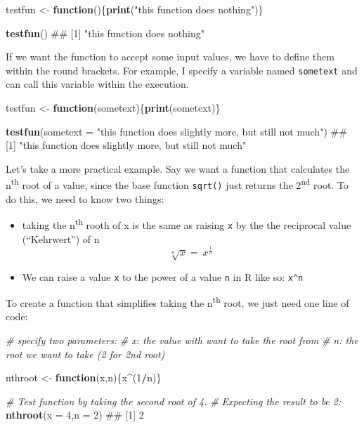 \documentclass[]{book}
\newenvironment{Shaded}{\begin{snugshade}}{\end{snugshade}}
\newcommand{\KeywordTok}[1]{\textcolor[rgb]{0.13,0.29,0.53}{\textbf{#1}}}
\newcommand{\DataTypeTok}[1]{\textcolor[rgb]{0.13,0.29,0.53}{#1}}
\newcommand{\DecValTok}[1]{\textcolor[rgb]{0.00,0.00,0.81}{#1}}
\newcommand{\StringTok}[1]{\textcolor[rgb]{0.31,0.60,0.02}{#1}}
\newcommand{\CommentTok}[1]{\textcolor[rgb]{0.56,0.35,0.01}{\textit{#1}}}
\newcommand{\ControlFlowTok}[1]{\textcolor[rgb]{0.13,0.29,0.53}{\textbf{#1}}}
\newcommand{\OperatorTok}[1]{\textcolor[rgb]{0.81,0.36,0.00}{\textbf{#1}}}
\newcommand{\NormalTok}[1]{#1}
\providecommand{\tightlist}{%
  \setlength{\itemsep}{0pt}\setlength{\parskip}{0pt}}
\begin{document}
\begin{Shaded}
\begin{Highlighting}[]
\NormalTok{testfun <-}\StringTok{ }\ControlFlowTok{function}\NormalTok{()\{}\KeywordTok{print}\NormalTok{(}\StringTok{"this function does nothing"}\NormalTok{)\}}

\KeywordTok{testfun}\NormalTok{()}
\NormalTok{## [1] "this function does nothing"}
\end{Highlighting}
\end{Shaded}

If we want the function to accept some input values, we have to define
them within the round brackets. For example, I specify a variable named
\texttt{sometext} and can call this variable within the execution.

\begin{Shaded}
\begin{Highlighting}[]
\NormalTok{testfun <-}\StringTok{ }\ControlFlowTok{function}\NormalTok{(sometext)\{}\KeywordTok{print}\NormalTok{(sometext)\}}

\KeywordTok{testfun}\NormalTok{(}\DataTypeTok{sometext =} \StringTok{"this function does slightly more, but still not much"}\NormalTok{)}
\NormalTok{## [1] "this function does slightly more, but still not much"}
\end{Highlighting}
\end{Shaded}

Let's take a more practical example. Say we want a function that
calculates the n\textsuperscript{th} root of a value, since the base
function \texttt{sqrt()} just returns the 2\textsuperscript{nd} root. To
do this, we need to know two things:

\begin{itemize}
\tightlist
\item
  taking the n\textsuperscript{th} rooth of x is the same as raising
  \texttt{x} by the the reciprocal value (``Kehrwert'') of n
  \[\sqrt[n]{x}=\ x^{\frac{1}{n}}\]
\item
  We can raise a value \texttt{x} to the power of a value \texttt{n} in
  R like so: \texttt{x\^{}n}
\end{itemize}

To create a function that simplifies taking the n\textsuperscript{th}
root, we just need one line of code:

\begin{Shaded}
\begin{Highlighting}[]
\CommentTok{# specify two parameters:}
\CommentTok{# x: the value  with want to take the root from}
\CommentTok{# n: the root we want to take (2 for 2nd root)}

\NormalTok{nthroot <-}\StringTok{ }\ControlFlowTok{function}\NormalTok{(x,n)\{x}\OperatorTok{^}\NormalTok{(}\DecValTok{1}\OperatorTok{/}\NormalTok{n)\}}

\CommentTok{# Test function by taking the second root of 4. }
\CommentTok{# Expecting the result to be 2:}
\KeywordTok{nthroot}\NormalTok{(}\DataTypeTok{x =} \DecValTok{4}\NormalTok{,}\DataTypeTok{n =} \DecValTok{2}\NormalTok{)}
\NormalTok{## [1] 2}
\end{Highlighting}
\end{Shaded}
\end{document}
